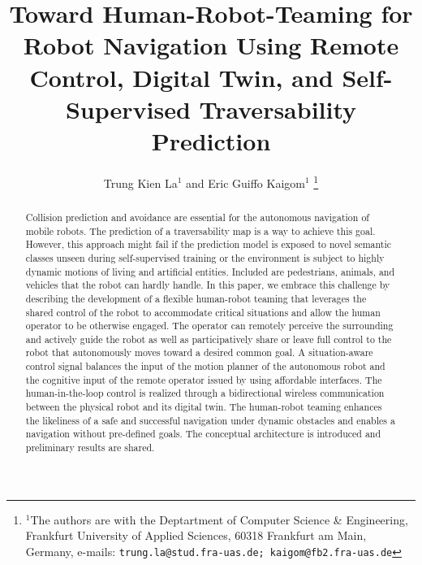 \documentclass[letterpaper, 10 pt, conference]{ieeeconf}  %
\title{\LARGE \bf
Toward Human-Robot-Teaming for  Robot Navigation Using
Remote  Control, Digital Twin, and  Self-Supervised  Traversability Prediction
}
\author{Trung Kien La$^{1}$ and Eric Guiffo Kaigom$^{1}$%
\thanks{$^{1}$The authors are with the Deptartment of Computer Science \& Engineering,
        Frankfurt University of Applied Sciences, 60318 Frankfurt am Main, Germany, e-mails:
        {\tt\small trung.la@stud.fra-uas.de; kaigom@fb2.fra-uas.de}}%
}
\begin{document}
\maketitle
\thispagestyle{empty}
\pagestyle{empty}


\begin{abstract}

Collision prediction and avoidance are essential for the autonomous navigation of mobile robots. The prediction of a traversability map is a way to achieve this goal. However, this approach might fail if the prediction model is exposed to novel semantic classes unseen during self-supervised training or  the environment is subject to  highly dynamic motions of living and artificial entities. Included are pedestrians, animals, and  vehicles that the robot can hardly handle. In this paper, we  embrace this challenge by describing the development of a flexible human-robot teaming that leverages the shared control of the robot to accommodate critical situations and allow the human operator to be otherwise engaged. The operator can remotely perceive the surrounding and actively guide the robot as well as participatively share or leave full control to the robot that autonomously moves toward a desired common goal. A situation-aware control signal balances the input of the motion planner of the autonomous robot and the cognitive input of the  remote  operator issued by using affordable  interfaces. %
The human-in-the-loop control is realized through a bidirectional wireless communication between the physical robot and its  digital twin.  The human-robot teaming enhances the likeliness of a safe and successful navigation under dynamic obstacles and enables a navigation without pre-defined goals. The conceptual architecture is introduced and preliminary results are shared.

\end{abstract}


\end{document}
